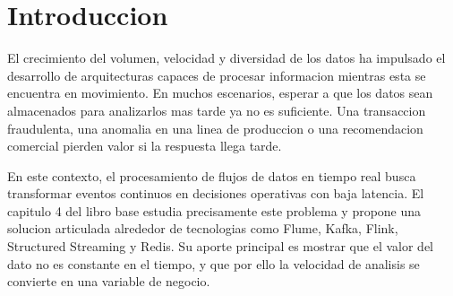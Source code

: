\documentclass[12pt,a4paper]{article}
\begin{document}
\begin{abstract}
El procesamiento de flujos de datos en tiempo real se ha convertido en una capacidad central para sistemas modernos que necesitan reaccionar ante eventos antes de que su valor se degrade. El capitulo 4 del material \textit{HCIP Big Data Developer V2.0 Training Material} de Huawei presenta una vision aplicada de este problema, su arquitectura de referencia y un conjunto de tecnologias clave para ingesta, mensajeria, computo distribuido y respuesta de baja latencia. La presente monografia sintetiza y amplía ese contenido con el objetivo de explicar los fundamentos del \textit{stream processing}, comparar sus principales componentes tecnologicos y relacionarlos con casos de uso reales como deteccion de fraude, analitica de comercio electronico, monitoreo IoT y ciberseguridad. Asimismo, se incorporan conceptos tecnicos imprescindibles para la construccion de un laboratorio, tales como tiempo de evento, ventanas, estado, \textit{checkpoints}, \textit{watermarks} y semanticas de entrega. El resultado es una base conceptual y aplicada para el desarrollo de una presentacion academica y de una implementacion practica orientada al curso.
\end{abstract}

\newpage
\tableofcontents
\newpage
{}
\setcounter{page}{1}

\section{Introduccion}

El crecimiento del volumen, velocidad y diversidad de los datos ha impulsado el desarrollo de arquitecturas capaces de procesar informacion mientras esta se encuentra en movimiento. En muchos escenarios, esperar a que los datos sean almacenados para analizarlos mas tarde ya no es suficiente. Una transaccion fraudulenta, una anomalia en una linea de produccion o una recomendacion comercial pierden valor si la respuesta llega tarde.

En este contexto, el procesamiento de flujos de datos en tiempo real busca transformar eventos continuos en decisiones operativas con baja latencia. El capitulo 4 del libro base estudia precisamente este problema y propone una solucion articulada alrededor de tecnologias como Flume, Kafka, Flink, Structured Streaming y Redis. Su aporte principal es mostrar que el valor del dato no es constante en el tiempo, y que por ello la velocidad de analisis se convierte en una variable de negocio.
\end{document}
